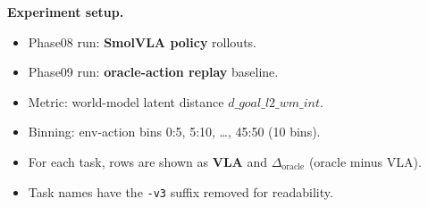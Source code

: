 \documentclass{article}
\begin{document}
\par\smallskip
\nopagebreak[4]











\noindent\textbf{Experiment setup.}
\begin{itemize}
\item Phase08 run: \textbf{SmolVLA policy} rollouts.
\item Phase09 run: \textbf{oracle-action replay} baseline.
\item Metric: world-model latent distance $d\_goal\_l2\_wm\_int$.
\item Binning: env-action bins 0:5, 5:10, \dots, 45:50 (10 bins).
\item For each task, rows are shown as \textbf{VLA} and \textbf{$\Delta_{\mathrm{oracle}}$} (oracle minus VLA).
\item Task names have the \texttt{-v3} suffix removed for readability.
\end{itemize}
\end{document}

